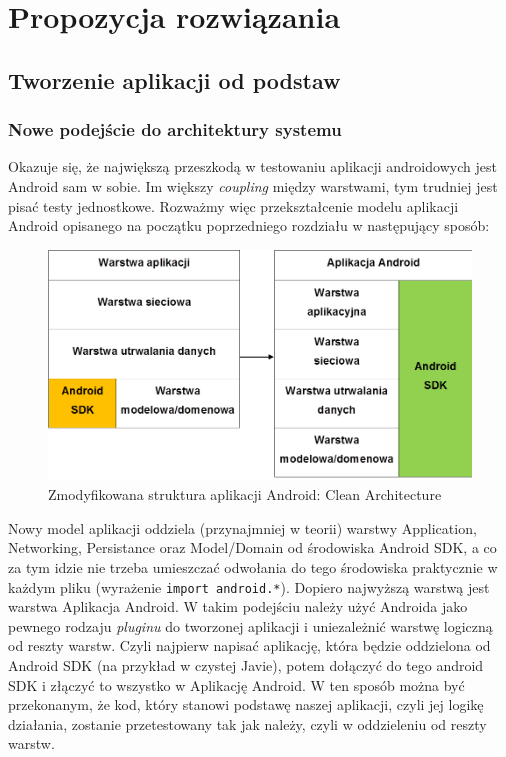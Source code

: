 \chapter{Propozycja rozwiązania}
\label{propozycja_rozwiazania}

\section{Tworzenie aplikacji od podstaw}
\label{nowa_aplikacja}
\subsection{Nowe podejście do architektury systemu}
\label{clean_architecture}
Okazuje się, że największą przeszkodą w testowaniu aplikacji androidowych jest Android sam w sobie. Im większy \textit{coupling} między warstwami, tym trudniej jest pisać testy jednostkowe. Rozważmy więc przekształcenie modelu aplikacji Android opisanego na początku poprzedniego rozdziału w następujący sposób:

\begin{figure}[!htb]
    \centering
    \includegraphics[width=13cm]{imgs/ch4_opis_rozwiazania_1.png}
    \caption
{Zmodyfikowana struktura aplikacji Android: Clean Architecture}
    \label{fig:opis_rozwiazania}
\end{figure} 

Nowy model aplikacji oddziela (przynajmniej w teorii) warstwy Application, Networking, Persistance oraz Model/Domain od środowiska Android SDK, a co za tym idzie nie trzeba umieszczać odwołania do tego środowiska praktycznie w każdym pliku (wyrażenie \texttt{import android.*}). Dopiero najwyższą warstwą jest warstwa Aplikacja Android. W takim podejściu należy użyć Androida jako pewnego rodzaju \textit{pluginu} do tworzonej aplikacji i uniezależnić warstwę logiczną od reszty warstw. Czyli najpierw napisać aplikację, która będzie oddzielona od Android SDK (na przykład w czystej Javie), potem dołączyć do tego android SDK i złączyć to wszystko w Aplikację Android. W ten sposób można być przekonanym, że kod, który stanowi podstawę naszej aplikacji, czyli jej logikę działania, zostanie przetestowany tak jak należy, czyli w oddzieleniu od reszty warstw.

